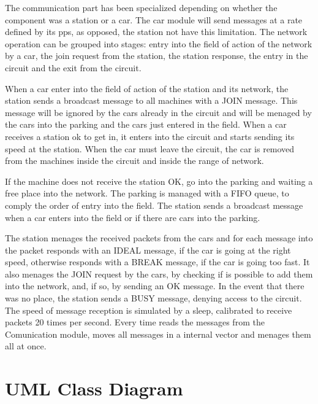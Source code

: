 \documentclass[a4paper,titlepage]{article}
\begin{document}
The communication part has been specialized depending on whether the component was a station or a car. The car module will send messages at a rate defined by its pps, as opposed, the station not have this limitation. 
The network operation can be grouped into stages: entry into the field of action of the network by a car, the join request from the station, the station response, the entry in the circuit and the exit from the circuit.

When a car enter into the field of action of the station and its network, the station sends a broadcast message to all machines with a JOIN message. This message will be ignored by the cars already in the circuit and will be menaged by the cars into the parking and the cars just entered in the field. When a car receives a station ok to get in, it enters into the circuit and starts sending its speed at the station. When the car must leave the circuit, the car is removed from the machines inside the circuit and inside the range of network.

If the machine does not receive the station OK, go into the parking and waiting a free place into the network.
The parking is managed with a FIFO queue, to comply the order of entry into the field.
The station sends a broadcast message when a car enters into the field or if there are cars into the parking.

The station menages the received packets from the cars and for each message into the packet responds with an IDEAL message, if the car is going at the right speed, otherwise responds with a BREAK message, if the car is going too fast.
It also menages the JOIN request by the cars, by checking if is possible to add them into the network, and, if so, by sending an OK message. In the event that there was no place, the station sends a BUSY message, denying access to the circuit.
The speed of message reception is simulated by a sleep, calibrated to receive packets 20 times per second. Every time reads the messages from the Comunication module, moves all messages in a internal vector and menages them all at once.

\newpage
\part{UML Class Diagram}
\end{document}
